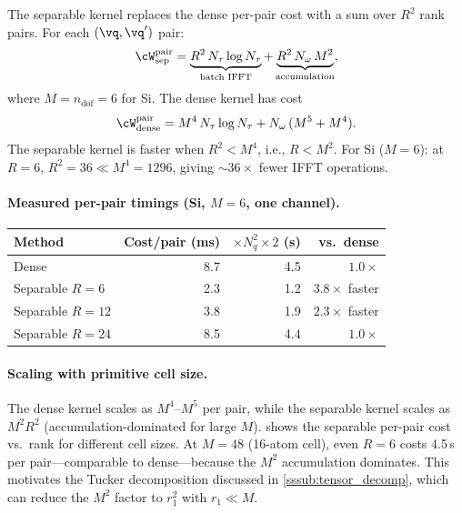The separable kernel replaces the dense per-pair cost with a sum
over $R^2$ rank pairs.  For each $(\vq,\vq')$ pair:
\begin{equation}\label{eq:sep_cost}
  \cW_\mathrm{sep}^{\mathrm{pair}}
  = \underbrace{R^2\,N_\tau \log N_\tau}_{\text{batch IFFT}}
  + \underbrace{R^2\,N_\omega\,M^2}_{\text{accumulation}},
\end{equation}
where $M = n_\mathrm{dof} = 6$ for Si.  The dense kernel has cost
\begin{equation}
  \cW_\mathrm{dense}^{\mathrm{pair}}
  = M^4\,N_\tau \log N_\tau + N_\omega\,(M^5 + M^4).
\end{equation}
The separable kernel is faster when $R^2 < M^4$, i.e., $R < M^2$.
For Si ($M = 6$): at $R = 6$, $R^2 = 36 \ll M^4 = 1296$, giving
$\sim 36\times$ fewer IFFT operations.

\paragraph{Measured per-pair timings (Si, $M = 6$, one channel).}
\begin{center}
\begin{tabular}{lrrr}
  \toprule
  Method & Cost/pair (ms) & $\times N_q^2 \times 2$ (s) & vs.\ dense \\
  \midrule
  Dense             & 8.7  & 4.5  & $1.0\times$ \\
  Separable $R=6$   & 2.3  & 1.2  & $3.8\times$ faster \\
  Separable $R=12$  & 3.8  & 1.9  & $2.3\times$ faster \\
  Separable $R=24$  & 8.5  & 4.4  & $1.0\times$ \\
  \bottomrule
\end{tabular}
\end{center}

\paragraph{Scaling with primitive cell size.}
The dense kernel scales as $M^4$--$M^5$ per pair, while the separable
kernel scales as $M^2 R^2$ (accumulation-dominated for large $M$).
 shows the separable per-pair cost vs.\ rank for
different cell sizes.  At $M = 48$ (16-atom cell), even $R = 6$ costs
4.5\,s per pair---comparable to dense---because the $M^2$ accumulation
dominates.  This motivates the Tucker decomposition discussed in
\cref{sssub:tensor_decomp}, which can reduce the $M^2$ factor to
$r_1^2$ with $r_1 \ll M$.

